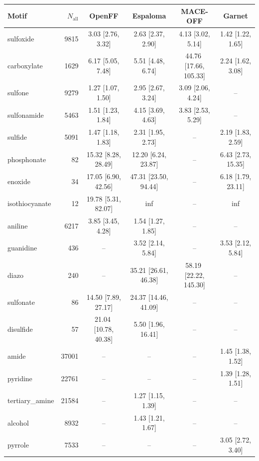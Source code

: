 \begin{table}[h!]
  \centering
  \small
  \setlength{\tabcolsep}{5pt}
  \renewcommand{\arraystretch}{1.15}
  \begin{tabular}{l r c c c c}
    \hline
    Motif & $N_\mathrm{all}$ & OpenFF & Espaloma & MACE-OFF & Garnet \\
    \hline
    sulfoxide & 9815 & 3.03\,\,[2.76, 3.32] & 2.63\,\,[2.37, 2.90] & 4.13\,\,[3.02, 5.14] & 1.42\,\,[1.22, 1.65] \\
    carboxylate & 1629 & 6.17\,\,[5.05, 7.48] & 5.51\,\,[4.48, 6.74] & 44.76\,\,[17.66, 105.33] & 2.24\,\,[1.62, 3.08] \\
    \hdashline
    sulfone & 9279 & 1.27\,\,[1.07, 1.50] & 2.95\,\,[2.67, 3.24] & 3.09\,\,[2.06, 4.24] & -- \\
    sulfonamide & 5463 & 1.51\,\,[1.23, 1.84] & 4.15\,\,[3.69, 4.63] & 3.83\,\,[2.53, 5.29] & -- \\
    sulfide & 5091 & 1.47\,\,[1.18, 1.83] & 2.31\,\,[1.95, 2.73] & -- & 2.19\,\,[1.83, 2.59] \\
    phosphonate & 82 & 15.32\,\,[8.28, 28.49] & 12.20\,\,[6.24, 23.87] & -- & 6.43\,\,[2.73, 15.35] \\
    enoxide & 34 & 17.05\,\,[6.90, 42.56] & 47.31\,\,[23.50, 94.44] & -- & 6.18\,\,[1.79, 23.11] \\
    isothiocyanate & 12 & 19.78\,\,[5.31, 82.07] & inf & -- & inf \\
    \hdashline
    aniline & 6217 & 3.85\,\,[3.45, 4.28] & 1.54\,\,[1.27, 1.85] & -- & -- \\
    guanidine & 436 & -- & 3.52\,\,[2.14, 5.84] & -- & 3.53\,\,[2.12, 5.84] \\
    diazo & 240 & -- & 35.21\,\,[26.61, 46.38] & 58.19\,\,[22.22, 145.30] & -- \\
    sulfonate & 86 & 14.50\,\,[7.89, 27.17] & 24.37\,\,[14.46, 41.09] & -- & -- \\
    disulfide & 57 & 21.04\,\,[10.78, 40.38] & 5.50\,\,[1.96, 16.41] & -- & -- \\
    \hdashline
    amide & 37001 & -- & -- & -- & 1.45\,\,[1.38, 1.52] \\
    pyridine & 22761 & -- & -- & -- & 1.39\,\,[1.28, 1.51] \\
    tertiary\_amine & 21584 & -- & 1.27\,\,[1.15, 1.39] & -- & -- \\
    alcohol & 8932 & -- & 1.43\,\,[1.21, 1.67] & -- & -- \\
    pyrrole & 7533 & -- & -- & -- & 3.05\,\,[2.72, 3.40] \\

\end{tabular}
\end{table}
